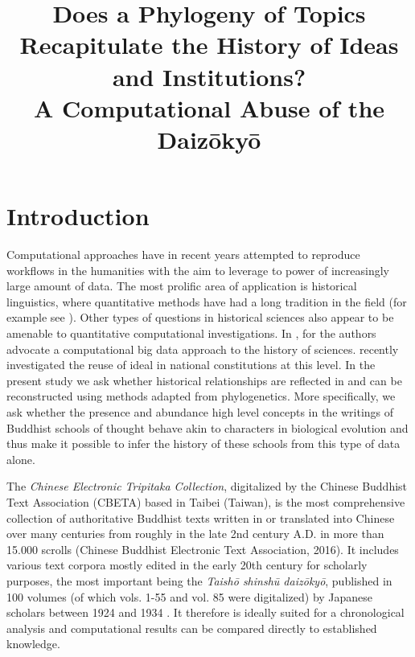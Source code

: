 \documentclass[a4paper,10pt]{article}
\title{Does a Phylogeny of Topics Recapitulate the History of Ideas and 
  Institutions? \\
  A Computational Abuse of the Daiz{\=o}ky{\=o}}
\date{}
\begin{document}
\maketitleabstract

\section{Introduction}

Computational approaches have in recent years attempted to reproduce
workflows in the humanities with the aim to leverage to power of
increasingly large amount of data. The most prolific area of application is
historical linguistics, where quantitative methods have had a long
tradition in the field (for example see 
\cite{levinson_tools_2012,gray_language-tree_2003,croft2008evolutionary}). 
Other types of questions in historical sciences also appear to be
amenable to quantitative computational investigations. In
\cite{Laubichler:13}, for the authors advocate a computational big data
approach to the history of sciences. \cite{Rockmore:16} recently
investigated the reuse of ideal in national constitutions at this level. In
the present study we ask whether historical relationships are reflected in
and can be reconstructed using methods adapted from phylogenetics. More
specifically, we ask whether the presence and abundance high level concepts
in the writings of Buddhist schools of thought behave akin to characters in
biological evolution and thus make it possible to infer the history of
these schools from this type of data alone.

The \textit{Chinese Electronic Tripitaka Collection}, digitalized by the Chinese 
Buddhist Text Association (CBETA) based in Taibei (Taiwan), is the most 
comprehensive collection of authoritative Buddhist texts written in or 
translated into Chinese over many centuries from roughly in the late 2nd 
century A.D. in more than 15.000 scrolls (Chinese Buddhist Electronic 
Text Association, 2016). It includes various text corpora mostly edited 
in the early 20th century for scholarly purposes, the most important 
being the \emph{Taish{\=o} shinsh{\=u} daiz{\=o}ky{\=o}}, published in 100 volumes (of which 
vols. 1-55 and vol. 85 were digitalized) by Japanese scholars between 
1924 and 1934 \cite{Takakusu J. and Watanabe K., 1924-1934}. It therefore is ideally suited for
a chronological analysis and computational results can be compared directly
to established knowledge.
\end{document}
